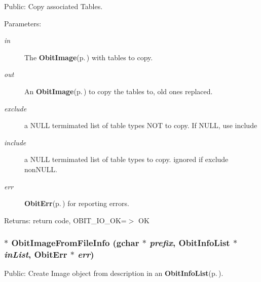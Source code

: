Public: Copy associated Tables. 

\begin{Desc}
\item[Parameters:]
\begin{description}
\item[{\em in}]The {\bf Obit\-Image}{\rm (p.\,\pageref{structObitImage})} with tables to copy. \item[{\em out}]An {\bf Obit\-Image}{\rm (p.\,\pageref{structObitImage})} to copy the tables to, old ones replaced. \item[{\em exclude}]a NULL termimated list of table types NOT to copy. If NULL, use include \item[{\em include}]a NULL termimated list of table types to copy. ignored if exclude non\-NULL. \item[{\em err}]{\bf Obit\-Err}{\rm (p.\,\pageref{structObitErr})} for reporting errors. \end{description}
\end{Desc}
\begin{Desc}
\item[Returns:]return code, OBIT\_\-IO\_\-OK=$>$ OK \end{Desc}
\subsubsection{$\ast$ Obit\-Image\-From\-File\-Info (gchar $\ast$ {\em prefix}, {\bf Obit\-Info\-List} $\ast$ {\em in\-List}, {\bf Obit\-Err} $\ast$ {\em err})}\label{ObitImage_8h_a18}


Public: Create Image object from description in an {\bf Obit\-Info\-List}{\rm (p.\,\pageref{structObitInfoList})}. 

